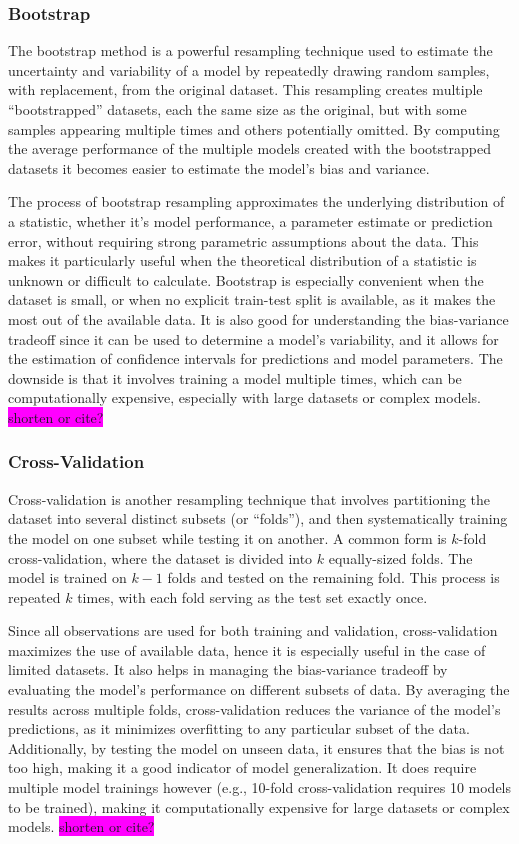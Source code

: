 \documentclass[aps,pra,english,notitlepage,reprint,nofootinbib]{revtex4-1}  %
\begin{document}
\subsubsection{Bootstrap}
The bootstrap method is a powerful resampling technique used to estimate the uncertainty and variability of a model by repeatedly drawing random samples, with replacement, from the original dataset. This resampling creates multiple ``bootstrapped'' datasets, each the same size as the original, but with some samples appearing multiple times and others potentially omitted. By computing the average performance of the multiple models created with the bootstrapped datasets it becomes easier to estimate the model's bias and variance.

The process of bootstrap resampling approximates the underlying distribution of a statistic, whether it's model performance, a parameter estimate or prediction error, without requiring strong parametric assumptions about the data. This makes it particularly useful when the theoretical distribution of a statistic is unknown or difficult to calculate. Bootstrap is especially convenient when the dataset is small, or when no explicit train-test split is available, as it makes the most out of the available data. It is also good for understanding the bias-variance tradeoff since it can be used to determine a model's variability, and it allows for the estimation of confidence intervals for predictions and model parameters. The downside is that it involves training a model multiple times, which can be computationally expensive, especially with large datasets or complex models. \colorbox{magenta}{shorten or cite?}


\subsubsection{Cross-Validation}
Cross-validation is another resampling technique that involves partitioning the dataset into several distinct subsets (or ``folds''), and then systematically training the model on one subset while testing it on another. A common form is $k$-fold cross-validation, where the dataset is divided into $k$ equally-sized folds. The model is trained on $k-1$ folds and tested on the remaining fold. This process is repeated $k$ times, with each fold serving as the test set exactly once.

Since all observations are used for both training and validation, cross-validation maximizes the use of available data, hence it is especially useful in the case of limited datasets. It also helps in managing the bias-variance tradeoff by evaluating the model's performance on different subsets of data. By averaging the results across multiple folds, cross-validation reduces the variance of the model's predictions, as it minimizes overfitting to any particular subset of the data. Additionally, by testing the model on unseen data, it ensures that the bias is not too high, making it a good indicator of model generalization. It does require multiple model trainings however (e.g., 10-fold cross-validation requires 10 models to be trained), making it computationally expensive for large datasets or complex models.
\colorbox{magenta}{shorten or cite?}
\end{document}

